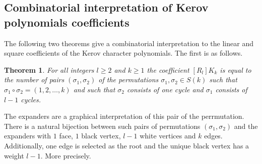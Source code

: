 \documentclass[submission]{FPSAC2021}
\newtheorem{theorem}{Theorem}
\begin{document}
\subsection{Combinatorial interpretation 
of Kerov polynomials coefficients}
The following two theorems 
\cite[Theorem 1.2, Theorem 1.3]{DFS10} 
give a combinatorial interpretation to 
the linear and square coefficients of 
the Kerov character polynomials.
The first is as follows.
\begin{theorem}
\label{thm1} 
For all integers $l\geq2$ and $k\geq 1$ 
the coefficient $[R_l] K_k$ 
is equal to the number of pairs 
$(\sigma_1,\sigma_2)$ of the permutations 
$\sigma_1, \sigma_2 \in S(k)$ such that
$\sigma_1\circ\sigma_2=(1,2,\ldots,k)$ and 
such that $\sigma_2$ consists of one
cycle and $\sigma_1$ consists of $l-1$ cycles.
\end{theorem}
The expanders are a graphical interpretation 
of this pair of the perrmutation.
There is a natural bijection between such 
pairs of permutations $(\sigma_1,
\sigma_2)$ and the expanders with $1$ face, 
$1$ black vertex, $l-1$ white
vertices and $k$ edges. Additionally, one edge 
is selected as the root and the unique black 
vertex has a weight $l-1$. More precisely.
\end{document}
